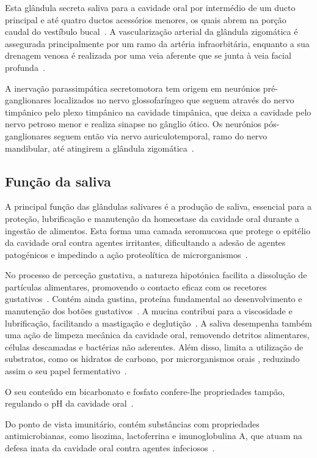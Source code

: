 Esta glândula secreta saliva para a cavidade oral por intermédio de um ducto principal e até quatro ductos acessórios menores, os quais abrem na porção caudal do vestíbulo bucal~\cite{lobprise_oral_2019}. 
A vascularização arterial da glândula zigomática é assegurada principalmente por um ramo da artéria infraorbitária, enquanto a sua drenagem venosa é realizada por uma veia aferente que se junta à veia facial profunda~\cite{evans_millers_2012}.

A inervação parassimpática secretomotora tem origem em neurónios pré-ganglionares localizados no nervo glossofaríngeo que seguem através do nervo timpânico pelo plexo timpânico na cavidade timpânica, que deixa a cavidade pelo nervo petroso menor e realiza sinapse no gânglio ótico. Os neurónios pós-ganglionares seguem então via nervo auriculotemporal, ramo do nervo mandibular, até atingirem a glândula zigomática~\cite{evans_millers_2012}.

\subsection{Função da saliva}

A principal função das glândulas salivares é a produção de saliva, essencial para a proteção, lubrificação e manutenção da homeostase da cavidade oral durante a ingestão de alimentos. Esta forma uma camada seromucosa que protege o epitélio da cavidade oral contra agentes irritantes, dificultando a adesão de agentes patogénicos e impedindo a ação proteolítica de microrganismos~\cite{Das_Textbook}.  


No processo de perceção gustativa, a natureza hipotónica facilita a dissolução de partículas alimentares, promovendo o contacto eficaz com os recetores gustativos~\cite{Das_Textbook}. Contém ainda gustina, proteína fundamental ao desenvolvimento e manutenção dos botões gustativos~\cite{Das_Textbook}. A mucina contribui para a viscosidade e lubrificação,  facilitando a mastigação e deglutição~\cite{Das_Textbook}.  
A saliva desempenha também uma ação de limpeza mecânica da cavidade oral, removendo detritos alimentares, células descamadas e bactérias não aderentes. Além disso, limita a utilização de substratos, como os hidratos de carbono, por microrganismos orais , reduzindo assim o seu papel fermentativo~\cite{Das_Textbook}.


O seu conteúdo em bicarbonato e fosfato confere-lhe propriedades tampão, regulando o pH da cavidade oral~\cite{Das_Textbook}.


Do ponto de vista imunitário, contém substâncias com propriedades antimicrobianas, como lisozima, lactoferrina e imunoglobulina A, que atuam na defesa inata da cavidade oral contra agentes infeciosos~\cite{Mescher2018}. 


